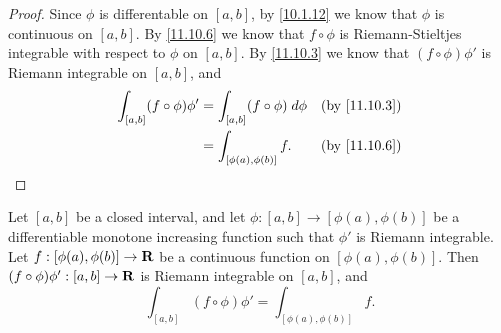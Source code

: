 \begin{proof}
  Since \(\phi\) is differentable on \([a, b]\), by \cref{10.1.12} we know that \(\phi\) is continuous on \([a, b]\).
  By \cref{11.10.6} we know that \(f \circ \phi\) is Riemann-Stieltjes integrable with respect to \(\phi\) on \([a, b]\).
  By \cref{11.10.3} we know that \((f \circ \phi) \phi'\) is Riemann integrable on \([a, b]\), and
  \begin{align*}
    \int_{[a, b]} (f \circ \phi) \phi' & = \int_{[a, b]} (f \circ \phi) \; d \phi & \text{(by \cref{11.10.3})} \\
                                       & = \int_{[\phi(a), \phi(b)]} f.           & \text{(by \cref{11.10.6})}
  \end{align*}
\end{proof}

\begin{additional corollary}\label{ac 11.10.1}
Let \([a, b]\) be a closed interval, and let \(\phi : [a, b] \to [\phi(a), \phi(b)]\) be a differentiable monotone increasing function such that \(\phi'\) is Riemann integrable.
Let \(f : [\phi(a), \phi(b)] \to \mathbf{R}\) be a continuous function on \([\phi(a), \phi(b)]\).
Then \((f \circ \phi) \phi' : [a, b] \to \mathbf{R}\) is Riemann integrable on \([a, b]\), and
\[
  \int_{[a, b]} (f \circ \phi) \phi' = \int_{[\phi(a), \phi(b)]} f.
\]
\end{additional corollary}

